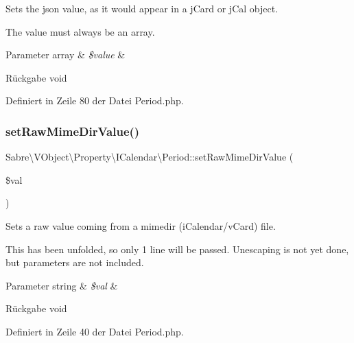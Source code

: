 Sets the json value, as it would appear in a j\+Card or j\+Cal object.

The value must always be an array.


\begin{DoxyParams}[1]{Parameter}
array & {\em \$value} & \\
\hline
\end{DoxyParams}
\begin{DoxyReturn}{Rückgabe}
void 
\end{DoxyReturn}


Definiert in Zeile 80 der Datei Period.\+php.

\mbox{\label{class_sabre_1_1_v_object_1_1_property_1_1_i_calendar_1_1_period_a94cb6c6a4870903fcb8a95fd20ee0cb8}} 
\subsubsection{\texorpdfstring{set\+Raw\+Mime\+Dir\+Value()}{setRawMimeDirValue()}}
{\footnotesize\ttfamily Sabre\textbackslash{}\+V\+Object\textbackslash{}\+Property\textbackslash{}\+I\+Calendar\textbackslash{}\+Period\+::set\+Raw\+Mime\+Dir\+Value (\begin{DoxyParamCaption}\item[{}]{\$val }\end{DoxyParamCaption})}

Sets a raw value coming from a mimedir (i\+Calendar/v\+Card) file.

This has been \textquotesingle{}unfolded\textquotesingle{}, so only 1 line will be passed. Unescaping is not yet done, but parameters are not included.


\begin{DoxyParams}[1]{Parameter}
string & {\em \$val} & \\
\hline
\end{DoxyParams}
\begin{DoxyReturn}{Rückgabe}
void 
\end{DoxyReturn}


Definiert in Zeile 40 der Datei Period.\+php.

